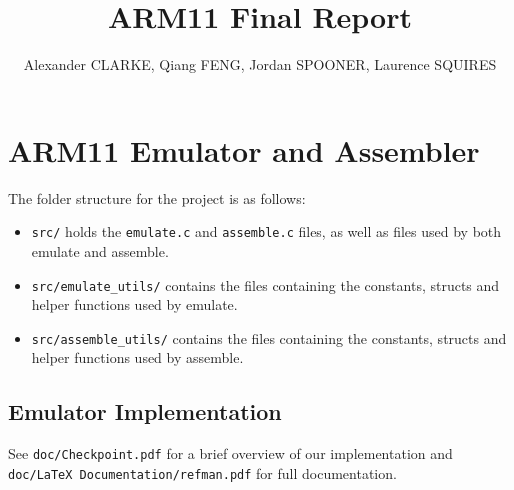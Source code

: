 \documentclass[10pt]{article}
\begin{document}
\title{\vspace{-2cm}ARM11 Final Report}
\author{\small Alexander CLARKE, Qiang FENG, Jordan SPOONER, Laurence SQUIRES}

\maketitle

\section{ARM11 Emulator and Assembler}

The folder structure for the project is as follows:

\begin{itemize}
\item \texttt{src/} holds the \texttt{emulate.c} and \texttt{assemble.c} files, as well as files used by both emulate and assemble.
\item \texttt{src/emulate\_utils/} contains the files containing the constants, structs and helper functions used by emulate.
\item \texttt{src/assemble\_utils/} contains the files containing the constants, structs and helper functions used by assemble.
\end{itemize}

\subsection{Emulator Implementation}

See \texttt{doc/Checkpoint.pdf} for a brief overview of our implementation and \texttt{doc/LaTeX Documentation/refman.pdf} for full documentation.
\end{document}
